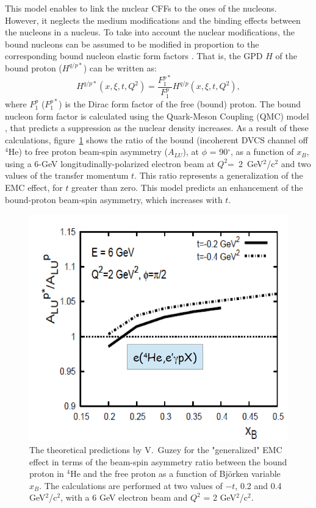 This model enables to link the nuclear CFFs to the ones of the nucleons. However, it neglects the medium modifications and the binding effects between the nucleons in a nucleus. To take into account the nuclear modifications, the bound nucleons can be assumed to be modified in proportion to the corresponding bound nucleon elastic form factors \cite{EMC_vadim_2}. That is, the GPD $H$ of the bound proton ($H^{q/p*}$) can be written as:
\begin{equation}
H^{q/p*}(x,\xi,t, Q^2) = \frac{F^{p*}_{1}}{F^{p}_{1}} H^{q/p}(x,\xi,t, Q^2),
\end{equation}
where $F^{p}_{1}$ ($F^{p*}_{1}$) is the Dirac form factor of the free (bound) proton.
The bound nucleon form factor is calculated using the Quark-Meson Coupling (QMC) model \cite{QMC}, that predicts a suppression as the nuclear density increases. As a result of these calculations, figure~\ref{fig:EMC_vadim} shows the ratio of the bound (incoherent DVCS channel off $^4$He) to free proton beam-spin asymmetry ($A_{LU}$), at $\phi$ = 90$^{\circ}$, as a function of $x_B$, using a 6-GeV longitudinally-polarized electron beam at $Q^2$=~2~GeV$^2$/c$^2$ and two values of the transfer momentum $t$. This ratio represents a generalization of the EMC effect, for $t$ greater than zero. This model predicts an enhancement of the bound-proton beam-spin asymmetry, which increases with $t$. \\
\begin{figure}[tbp]
\centering
\includegraphics[scale=0.35]{fig/EMC_ALU_vadim.png}
\caption{The theoretical predictions by V.~Guzey \cite{EMC_vadim_2} for the 
"generalized" EMC effect in terms of the beam-spin asymmetry ratio between the 
bound proton in $^4$He and the free proton as a function of Bj\"orken variable 
$x_B$. The calculations are performed at two values of $-t$, 0.2 and 0.4 
GeV$^2$/c$^2$, with a 6 GeV electron beam and $Q^2$ = 2 GeV$^2$/c$^2$. } 
\label{fig:EMC_vadim}
\end{figure}

